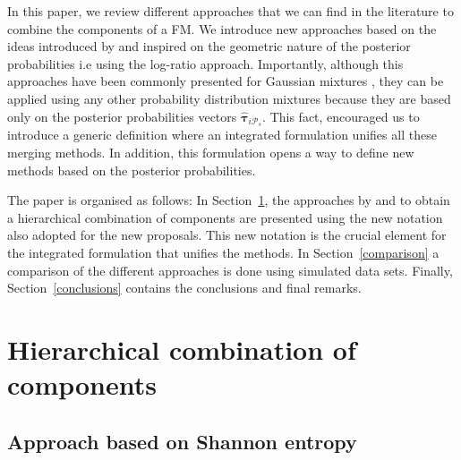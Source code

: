 \documentclass[10pt, a4paper]{article}
\newcommand{\m}[1]{\boldsymbol{#1}}
\begin{document}
\begin{spacing}{1.9}
In this paper, we review different approaches that we can find in the literature \citep{baudry2010combining, hennig2010methods} to combine the components of a FM. We introduce new approaches based on the ideas introduced by \cite{longford2014} and inspired on the geometric nature of the posterior probabilities i.e using the log-ratio approach. Importantly, although this approaches have been commonly presented for Gaussian mixtures \citep{longford2014,melnykov2013distribution,hennig2010methods,baudry2010combining}, they can be applied using any other probability distribution mixtures because they are based only on the posterior probabilities vectors $\hat{\m\tau}_{i \mathcal{P}_s}$. This fact, encouraged us to introduce a generic definition where an integrated formulation unifies all these merging methods. In addition, this formulation opens a way to define new methods based on the posterior probabilities.

The paper is organised as follows: In Section~\ref{old_methods}, the approaches by \cite{hennig2010methods} and \cite{baudry2010combining} to obtain a hierarchical combination of components are presented using the new notation also adopted for the new proposals. This new notation is the crucial element for the integrated formulation that unifies the methods. In Section~\ref{comparison} a comparison of the different approaches is done using simulated data sets. Finally, Section~\ref{conclusions} contains the conclusions and final remarks.


\section{Hierarchical combination of components}
\label{old_methods}


\subsection{Approach based on Shannon entropy}


\end{spacing}
\end{document}
